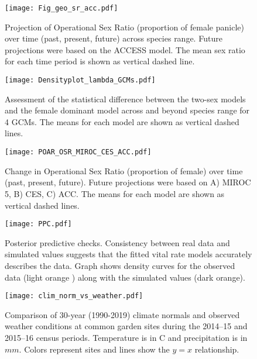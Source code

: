 \documentclass[9pt,twoside,lineno]{pnas-new}
\begin{document}
\begin{figure}[H]
	\begin{center}
		\texttt{[image: Fig\_geo\_sr\_acc.pdf]}
		\caption{Projection  of Operational Sex Ratio (proportion of female panicle) over time (past, present, future) across species range.
			Future projections were based on the ACCESS  model.
			The mean sex ratio for each time period is shown as vertical dashed line.}
		\label{Sup:geoosrprojacc}
	\end{center}
\end{figure}
\clearpage


\begin{figure}
\centering
\texttt{[image: Densityplot\_lambda\_GCMs.pdf]}
\caption{ Assessment of the statistical difference between the two-sex models and the female dominant model across and beyond species range for 4 GCMs. 
			The means for each model are shown as vertical dashed lines. }
\label{Sup:geo_overestimation}
\end{figure}
\clearpage
%
\begin{figure}
\centering
\texttt{[image: POAR\_OSR\_MIROC\_CES\_ACC.pdf]}
\caption{Change in Operational Sex Ratio (proportion of female) over time (past, present, future).
			Future projections were based on A) MIROC 5, B) CES, C) ACC.
			The means for each model are shown as vertical dashed lines.}
\label{Sup:osrall}
\end{figure}
\clearpage

\begin{figure}
\centering
\texttt{[image: PPC.pdf]}
\caption{Posterior predictive checks. Consistency between real data and simulated values suggests that the fitted vital rate models accurately describes the data. Graph shows density curves for the observed data (light orange ) along with the simulated values (dark orange).}
\label{Sup:PPC}
\end{figure}
\clearpage

\begin{figure}
\centering
\texttt{[image: clim\_norm\_vs\_weather.pdf]}
\caption{Comparison of 30-year (1990-2019) climate normals and observed weather conditions at common garden sites during the 2014--15 and 2015--16 census periods. Temperature is in \degree C and precipitation is in $mm$. Colors represent sites and lines show the $y=x$ relationship.}
\label{Sup:climate_normal_weather}
\end{figure}
\clearpage
\end{document}
